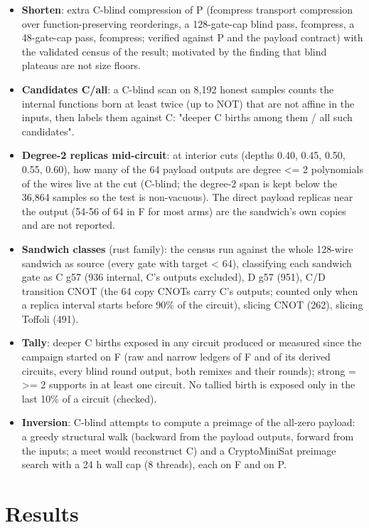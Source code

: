 \documentclass[10pt,a4paper]{article}
\begin{document}
\begin{itemize}
\item \textbf{Shorten}: extra C-blind compression of P (fcompress transport compression over function-preserving reorderings, a 128-gate-cap blind pass, fcompress, a 48-gate-cap pass, fcompress; verified against P and the payload contract) with the validated census of the result; motivated by the finding that blind plateaus are not size floors.
\item \textbf{Candidates C/\allowbreak{}all}: a C-blind scan on 8,192 honest samples counts the internal functions born at least twice (up to NOT) that are not affine in the inputs, then labels them against C: "deeper C births among them /\allowbreak{} all such candidates".
\item \textbf{Degree-2 replicas mid-circuit}: at interior cuts (depths 0.40, 0.45, 0.50, 0.55, 0.60), how many of the 64 payload outputs are degree \textless{}= 2 polynomials of the wires live at the cut (C-blind; the degree-2 span is kept below the 36,864 samples so the test is non-vacuous). The direct payload replicas near the output (54-56 of 64 in F for most arms) are the sandwich's own copies and are not reported.
\item \textbf{Sandwich classes} (rust family): the census run against the whole 128-wire sandwich as source (every gate with target \textless{} 64), classifying each sandwich gate as C g57 (936 internal, C's outputs excluded), D g57 (951), C/\allowbreak{}D transition CNOT (the 64 copy CNOTs carry C's outputs; counted only when a replica interval starts before 90\% of the circuit), slicing CNOT (262), slicing Toffoli (491).
\item \textbf{Tally}: deeper C births exposed in any circuit produced or measured since the campaign started on F (raw and narrow ledgers of F and of its derived circuits, every blind round output, both remixes and their rounds); strong = \textgreater{}= 2 supports in at least one circuit. No tallied birth is exposed only in the last 10\% of a circuit (checked).
\item \textbf{Inversion}: C-blind attempts to compute a preimage of the all-zero payload: a greedy structural walk (backward from the payload outputs, forward from the inputs; a meet would reconstruct C) and a CryptoMiniSat preimage search with a 24 h wall cap (8 threads), each on F and on P.
\end{itemize}

\section{Results}
\end{document}
